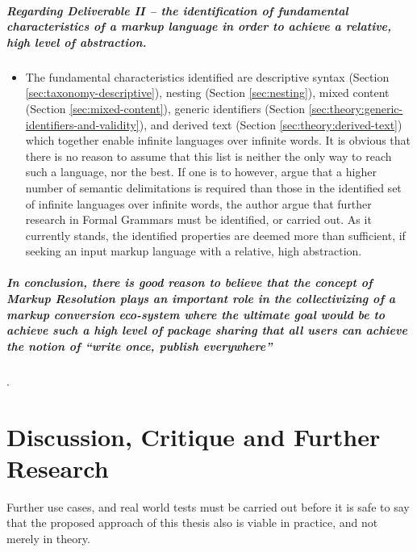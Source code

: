 \documentclass{scrreprt}
\begin{document}
\paragraph{Regarding Deliverable II -- the identification of fundamental characteristics of a markup language in order to achieve a relative, high level of abstraction. }
\begin{itemize}
\item The fundamental characteristics identified are descriptive syntax (Section \ref{sec:taxonomy-descriptive}), nesting (Section \ref{sec:nesting}), mixed content (Section \ref{sec:mixed-content}), generic identifiers (Section \ref{sec:theory:generic-identifiers-and-validity}), and derived text (Section \ref{sec:theory:derived-text}) which together enable infinite languages over infinite words. It is obvious that there is no reason to assume that this list is neither the only way to reach such a language, nor the best. If one is to however, argue that a higher number of semantic delimitations is required than those in the identified set of infinite languages over infinite words, the author argue that further research in Formal Grammars must be identified, or carried out. As it currently stands, the identified properties are deemed more than sufficient, if seeking an input markup language with a relative, high abstraction.
\end{itemize}



\paragraph{In conclusion, there is good reason to believe that the concept of Markup Resolution plays an important role in the collectivizing of a markup conversion eco-system where the ultimate goal would be to achieve such a high level of package sharing that all users can achieve the notion of ``write once, publish everywhere''}.











%
%
%
%
%
%


\chapter{Discussion, Critique and Further Research}
Further use cases, and real world tests must be carried out before it is safe to say that the proposed approach of this thesis also is viable in practice, and not merely in theory.
\end{document}
